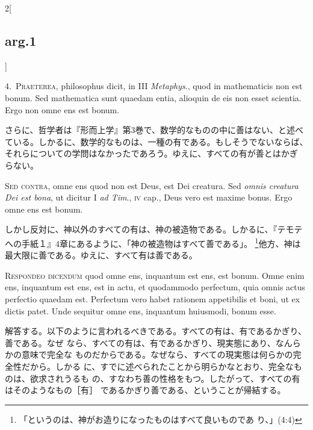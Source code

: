 \documentclass[paper=a4paper,fontsize=10pt,jafontsize=9pt,titlepage]{jlreq}
\begin{document}
\begin{paracol}{2}[\subsection{arg.1}]

4.~{\scshape Praeterea}, philosophus dicit, in III {\itshape Metaphys}.,
 quod in mathematicis non est bonum. Sed mathematica sunt quaedam entia,
 alioquin de eis non esset scientia. Ergo non omne ens est bonum.

\switchcolumn

さらに、哲学者は『形而上学』第3巻で、数学的なものの中に善はない、と述べ
 ている。しかるに、数学的なものは、一種の有である。もしそうでないならば、
 それらについての学問はなかったであろう。ゆえに、すべての有が善とはかぎ
 らない。

\switchcolumn*[\subsection{s.c.}]

{\scshape Sed contra}, omne ens quod non est Deus, est Dei creatura. Sed
 {\itshape omnis creatura Dei est bona}, ut dicitur I {\itshape ad
 Tim}., {\scshape iv} cap., Deus vero est maxime bonus. Ergo omne ens
 est bonum.

\switchcolumn

しかし反対に、神以外のすべての有は、神の被造物である。しかるに、『テモテ
 への手紙１』4章にあるように、「神の被造物はすべて善である」。
 \footnote{「というのは、神がお造りになったものはすべて良いものであ
 り、」(4:4)}他方、神は
 最大限に善である。ゆえに、すべて有は善である。


{\scshape Respondeo dicendum} quod omne ens, inquantum est ens, est
 bonum. Omne enim ens, inquantum est ens, est in actu, et quodammodo
 perfectum, quia omnis actus perfectio quaedam est. Perfectum vero habet
 rationem appetibilis et boni, ut ex dictis patet. Unde sequitur omne
 ens, inquantum huiusmodi, bonum esse.

\switchcolumn

解答する。以下のように言われるべきである。すべての有は、有であるかぎり、善である。なぜ
 なら、すべての有は、有であるかぎり、現実態にあり、なんらかの意味で完全な
 ものだからである。なぜなら、すべての現実態は何らかの完全性だから。しかる
 に、すでに述べられたことから明らかなとおり、完全なものは、欲求されうるも
 の、すなわち善の性格をもつ。したがって、すべての有はそのようなもの［有］
 であるかぎり善である、ということが帰結する。


\end{paracol}
\end{document}
